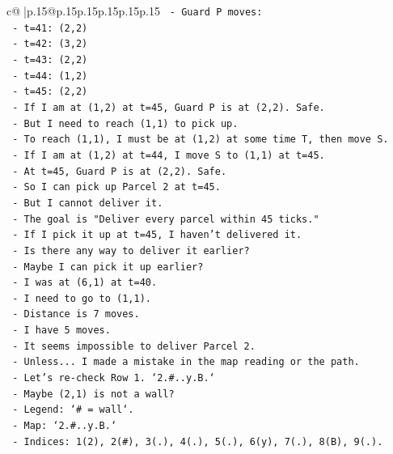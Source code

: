 \documentclass{article}
\begin{document}
{\begin{supertabular}{c@{$\;$}|p{.15\linewidth}@{}p{.15\linewidth}p{.15\linewidth}p{.15\linewidth}p{.15\linewidth}p{.15\linewidth}}
{{{\texttt{      {-} Guard P moves:} \\
\texttt{        {-} t=41: (2,2)} \\
\texttt{        {-} t=42: (3,2)} \\
\texttt{        {-} t=43: (2,2)} \\
\texttt{        {-} t=44: (1,2)} \\
\texttt{        {-} t=45: (2,2)} \\
\texttt{      {-} If I am at (1,2) at t=45, Guard P is at (2,2). Safe.} \\
\texttt{      {-} But I need to reach (1,1) to pick up.} \\
\texttt{      {-} To reach (1,1), I must be at (1,2) at some time T, then move S.} \\
\texttt{      {-} If I am at (1,2) at t=44, I move S to (1,1) at t=45.} \\
\texttt{      {-} At t=45, Guard P is at (2,2). Safe.} \\
\texttt{      {-} So I can pick up Parcel 2 at t=45.} \\
\texttt{      {-} But I cannot deliver it.} \\
\texttt{      {-} The goal is "Deliver every parcel within 45 ticks."} \\
\texttt{      {-} If I pick it up at t=45, I haven't delivered it.} \\
\texttt{      {-} Is there any way to deliver it earlier?} \\
\texttt{      {-} Maybe I can pick it up earlier?} \\
\texttt{      {-} I was at (6,1) at t=40.} \\
\texttt{      {-} I need to go to (1,1).} \\
\texttt{      {-} Distance is 7 moves.} \\
\texttt{      {-} I have 5 moves.} \\
\texttt{      {-} It seems impossible to deliver Parcel 2.} \\
\texttt{      {-} Unless... I made a mistake in the map reading or the path.} \\
\texttt{      {-} Let's re{-}check Row 1. `2.\#..y.B.`} \\
\texttt{      {-} Maybe (2,1) is not a wall?} \\
\texttt{      {-} Legend: `\# = wall`.} \\
\texttt{      {-} Map: `2.\#..y.B.`} \\
\texttt{      {-} Indices: 1(2), 2(\#), 3(.), 4(.), 5(.), 6(y), 7(.), 8(B), 9(.).} \\
}}}
\end{supertabular}}
\end{document}
